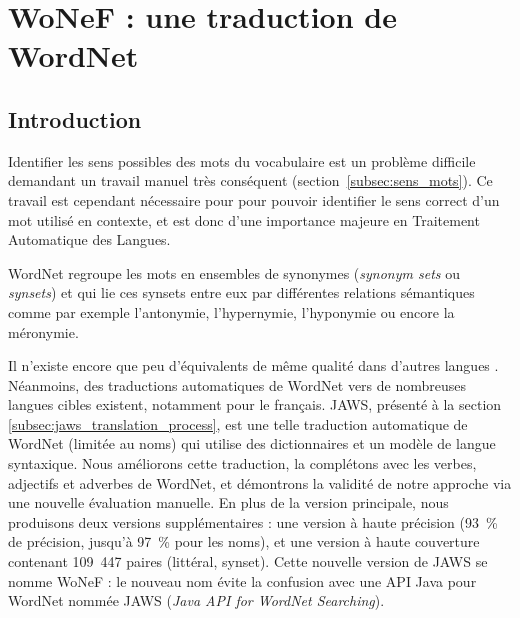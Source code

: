 

\chapter{WoNeF : une traduction de WordNet}
\label{ch:wonef} 

\section{Introduction}
\label{sec:intro}


Identifier les sens possibles des mots du vocabulaire est un problème difficile
demandant un travail manuel très conséquent (section~\ref{subsec:sens_mots}).
Ce travail est cependant nécessaire pour pour pouvoir identifier le sens
correct d'un mot utilisé en contexte, et est donc d'une importance majeure en
Traitement Automatique des Langues.

WordNet \citep{fellbaum1998wordnet} regroupe les mots en ensembles de synonymes
(\emph{synonym sets} ou \emph{synsets}) et qui lie ces synsets entre eux par
différentes relations sémantiques comme par exemple l'antonymie, l'hypernymie,
l'hyponymie ou encore la méronymie.


Il n'existe encore que peu d'équivalents de même qualité dans d'autres langues
\citep{bond2012survey}. Néanmoins, des traductions automatiques de WordNet vers
de nombreuses langues cibles existent, notamment pour le français. JAWS,
présenté à la section \ref{subsec:jaws_translation_process}, est une telle
traduction automatique de WordNet (limitée au noms) qui utilise des
dictionnaires et un modèle de langue syntaxique. Nous améliorons cette
traduction, la complétons avec les verbes, adjectifs et adverbes de WordNet, et
démontrons la validité de notre approche via une nouvelle évaluation manuelle.
En plus de la version principale, nous produisons deux versions supplémentaires
: une version à haute précision (93~\% de précision, jusqu'à 97~\% pour les
noms), et une version à haute couverture contenant 109~447 paires (littéral,
synset). Cette nouvelle version de JAWS se nomme WoNeF : le nouveau nom évite
la confusion avec une API Java pour WordNet nommée JAWS (\emph{Java API for
WordNet Searching}).


